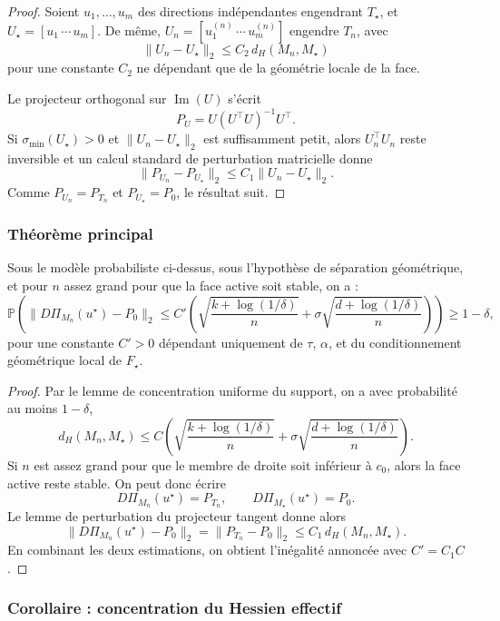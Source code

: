 \begin{proof}
Soient \(u_1,\dots,u_m\) des directions indépendantes engendrant \(T_\star\), et \(U_\star=[u_1\,\cdots\,u_m]\). De même, \(U_n=[u_1^{(n)}\,\cdots\,u_m^{(n)}]\) engendre \(T_n\), avec
\[
\|U_n-U_\star\|_2\le C_2\, d_H(M_n,M_\star)
\]
pour une constante \(C_2\) ne dépendant que de la géométrie locale de la face.

Le projecteur orthogonal sur \(\operatorname{Im}(U)\) s'écrit
\[
P_U=U(U^\top U)^{-1}U^\top.
\]
Si \(\sigma_{\min}(U_\star)>0\) et \(\|U_n-U_\star\|_2\) est suffisamment petit, alors \(U_n^\top U_n\) reste inversible et un calcul standard de perturbation matricielle donne
\[
\|P_{U_n}-P_{U_\star}\|_2
\le
C_1\|U_n-U_\star\|_2.
\]
Comme \(P_{U_n}=P_{T_n}\) et \(P_{U_\star}=P_0\), le résultat suit.
\end{proof}

\subsubsection{Théorème principal}

\begin{theorem}
Sous le modèle probabiliste ci-dessus, sous l'hypothèse de séparation géométrique, et pour \(n\) assez grand pour que la face active soit stable, on a :
\[
\mathbb P\!\left(
\|D\Pi_{M_n}(u^\star)-P_0\|_2
\le
C'\left(
\sqrt{\frac{k+\log(1/\delta)}{n}}
+
\sigma\sqrt{\frac{d+\log(1/\delta)}{n}}
\right)
\right)\ge 1-\delta,
\]
pour une constante \(C'>0\) dépendant uniquement de \(\tau\), \(\alpha\), et du conditionnement géométrique local de \(F_\star\).
\end{theorem}

\begin{proof}
Par le lemme de concentration uniforme du support, on a avec probabilité au moins \(1-\delta\),
\[
d_H(M_n,M_\star)
\le
C\left(
\sqrt{\frac{k+\log(1/\delta)}{n}}
+
\sigma\sqrt{\frac{d+\log(1/\delta)}{n}}
\right).
\]
Si \(n\) est assez grand pour que le membre de droite soit inférieur à \(c_0\), alors la face active reste stable. On peut donc écrire
\[
D\Pi_{M_n}(u^\star)=P_{T_n},
\qquad
D\Pi_{M_\star}(u^\star)=P_0.
\]
Le lemme de perturbation du projecteur tangent donne alors
\[
\|D\Pi_{M_n}(u^\star)-P_0\|_2
=
\|P_{T_n}-P_0\|_2
\le
C_1\, d_H(M_n,M_\star).
\]
En combinant les deux estimations, on obtient l'inégalité annoncée avec \(C'=C_1C\).
\end{proof}

\subsubsection{Corollaire : concentration du Hessien effectif}


